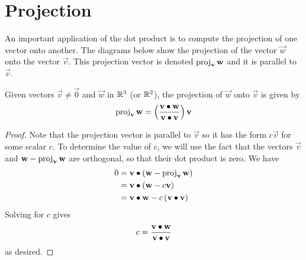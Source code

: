\documentclass[handout]{ximera}
\begin{document}
\section{Projection}

An important application of the dot product is to compute the projection of one vector onto another.
The diagrams below show the projection of the vector $\vec{w}$ onto the vector $\vec{v}$. 
This projection vector is denoted $\operatorname{proj}_{\mathbf{v}} \mathbf{w}$
and it is parallel to $\vec{v}$.

\begin{image}
\end{image}

\begin{proposition}
Given vectors $\vec{v} \neq \vec{0}$ and $\vec{w}$ in $\mathbb R^3$ (or $\mathbb R^2$), the projection of $\vec{w}$ onto $\vec{v}$ is given by
\[
\operatorname{proj}_{\mathbf{v}} \mathbf{w} = \left(\frac{\mathbf{v} \bullet \mathbf{w}}{\mathbf{v} \bullet \mathbf{v}}\right) \mathbf{v}
\]


\begin{proof}
Note that the projection vector is parallel to $\vec{v}$ so it has the form $c \vec{v}$ for some scalar $c$.
To determine the value of $c$, we will use the fact that the vectors $\vec{v}$ and $\mathbf{w} - \operatorname{proj}_{\mathbf{v}} \mathbf{w}$ are orthogonal, 
so that their dot product is zero. We have
\begin{align*}
0 &= \mathbf{v} \bullet \left(\mathbf{w} - \operatorname{proj}_{\mathbf{v}} \mathbf{w} \right)\\
  &= \mathbf{v} \bullet \left(\mathbf{w} - c \mathbf{v}\right)\\
  &= \mathbf{v} \bullet \mathbf{w} - c \left( \mathbf{v} \bullet \mathbf{v} \right)
\end{align*}
Solving for $c$ gives
\[
c = \frac{\mathbf{v} \bullet \mathbf{w}}{\mathbf{v} \bullet \mathbf{v}}
\]
as desired.
\end{proof}
\end{proposition}
\end{document}
